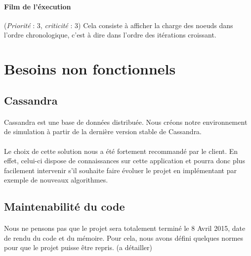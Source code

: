 \documentclass[12pt]{article}
\newcommand{\besoin}[2] {
  (\textit{Priorité} : #1, \textit{criticité} : #2)
}
\begin{document}
\paragraph{Film de l'éxecution} \besoin{3}{3} Cela consiste à afficher la charge des noeuds dans l'ordre chronologique, c'est à dire dans l'ordre des itérations croissant.


\newpage

\section{Besoins non fonctionnels}

\subsection{Cassandra}

\paragraph{} Cassandra est une base de données distribuée.
Nous créons notre environnement de simulation à partir de la dernière version stable de Cassandra.

\paragraph{} Le choix de cette solution nous a été fortement recommandé par le client.
En effet, celui-ci dispose de connaissances sur cette application et pourra donc plus facilement intervenir s'il souhaite faire évoluer le projet en implémentant par exemple de nouveaux algorithmes.



\subsection{Maintenabilité du code}

\paragraph{} Nous ne pensons pas que le projet sera totalement terminé le 8 Avril 2015, date de rendu du code et du mémoire.
Pour cela, nous avons défini quelques normes pour que le projet puisse être repris. (a détailler)

\paragraph{}
\end{document}
